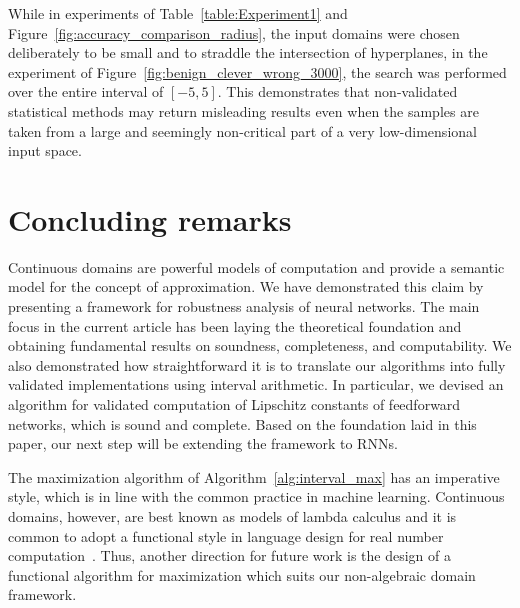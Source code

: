 \documentclass[11pt,times]{article}
\begin{document}
While in experiments of Table~\ref{table:Experiment1} and
Figure~\ref{fig:accuracy_comparison_radius}, the input domains were
chosen deliberately to be small and to straddle the intersection of
hyperplanes, in the experiment of
Figure~\ref{fig:benign_clever_wrong_3000}, the search was performed
over the entire interval of $[-5,5]$. This demonstrates that
non-validated statistical methods may return misleading results even
when the samples are taken from a large and seemingly non-critical
part of a very low-dimensional input space.





  

\section{Concluding remarks}
\label{sec:concluding_remarks}


Continuous domains are powerful models of computation and provide a
semantic model for the concept of approximation. We have demonstrated
this claim by presenting a framework for robustness analysis of neural
networks. The main focus in the current article has been laying the
theoretical foundation and obtaining fundamental results on soundness,
completeness, and computability. We also demonstrated how
straightforward it is to translate our algorithms into fully validated
implementations using interval arithmetic. In particular, we devised
an algorithm for validated computation of Lipschitz constants of
feedforward networks, which is sound and complete. Based on the
foundation laid in this paper, our next step will be extending the
framework to \acp{RNN}.

The maximization algorithm of Algorithm~\ref{alg:interval_max} has an
imperative style, which is in line with the common practice in machine
learning. Continuous domains, however, are best known as models of
lambda calculus and it is common to adopt a functional style in
language design for real number
computation~\parencite{Escardo96-tcs,Farjudian:Shrad:2007,DiGianantonio_Edalat-PCDF:2013}. Thus,
another direction for future work is the design of a functional
algorithm for maximization which suits our non-algebraic domain
framework.











\printbibliography
\end{document}
